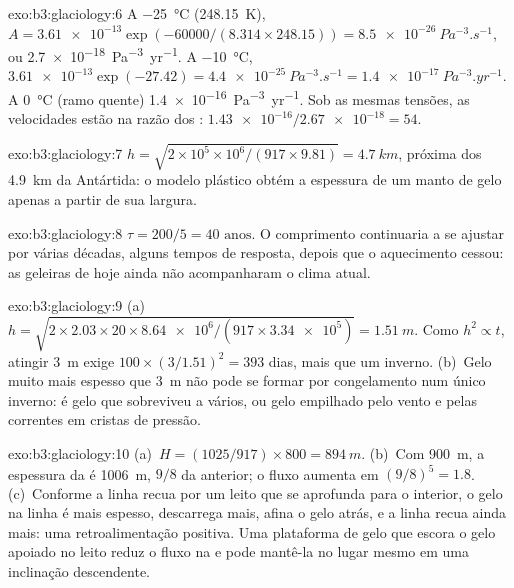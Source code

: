 \begin{solution}{exo:b3:glaciology:6}
A \qty{-25}{\celsius} (\qty{248.15}{K}), $A = \num{3.61e-13}\exp(-60000/
(8.314\times248.15)) = \qty{8.5e-26}{Pa^{-3}.s^{-1}}$, ou
\qty{2.7e-18}{Pa^{-3}.yr^{-1}}. A \qty{-10}{\celsius}, $\num{3.61e-13}
\exp(-27.42) = \qty{4.4e-25}{Pa^{-3}.s^{-1}} = \qty{1.4e-17}{Pa^{-3}.yr^{-1}}$.
A \qty{0}{\celsius} (ramo quente) \qty{1.4e-16}{Pa^{-3}.yr^{-1}}. Sob
as mesmas tensões, as velocidades estão na razão dos :
$\num{1.43e-16}/\num{2.67e-18} = 54$.
\end{solution}

\begin{solution}{exo:b3:glaciology:7}
$h = \sqrt{2\times10^5\times10^6/(917\times9.81)} = \qty{4.7}{km}$, próxima dos
\qty{4.9}{km} da Antártida: o modelo plástico obtém a espessura de um
manto de gelo apenas a partir de sua largura.
\end{solution}

\begin{solution}{exo:b3:glaciology:8}
$\tau = 200/5 = \num{40}\text{ anos}$. O comprimento continuaria a se ajustar por
várias décadas, alguns tempos de resposta, depois que o aquecimento cessou: as
geleiras de hoje ainda não acompanharam o clima atual.
\end{solution}

\begin{solution}{exo:b3:glaciology:9}
(a)~$h = \sqrt{2\times2.03\times20\times\num{8.64e6}/(917\times\num{3.34e5})}
= \qty{1.51}{m}$. Como $h^2 \propto t$, atingir \qty{3}{m} exige $100\times
(3/1.51)^2 = 393$ dias, mais que um inverno. (b)~Gelo muito mais espesso que
\qty{3}{m} não pode se formar por congelamento num único inverno: é gelo que
sobreviveu a vários, ou gelo empilhado pelo vento e pelas correntes em cristas de pressão.
\end{solution}

\begin{solution}{exo:b3:glaciology:10}
(a)~$H = (1025/917)\times800 = \qty{894}{m}$. (b)~Com \qty{900}{m}, a
espessura da  é \qty{1006}{m}, $9/8$ da anterior; o fluxo
aumenta em $(9/8)^5 = 1.8$. (c)~Conforme a linha recua por um leito que se aprofunda
para o interior, o gelo na linha é mais espesso, descarrega mais, afina o gelo
atrás, e a linha recua ainda mais: uma retroalimentação positiva. Uma plataforma de gelo
que escora o gelo apoiado no leito reduz o fluxo na  e pode
mantê-la no lugar mesmo em uma inclinação descendente.
\end{solution}

